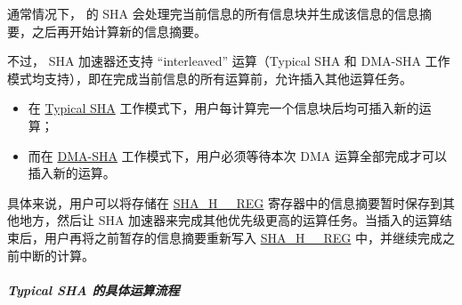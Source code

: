 \documentclass[main\_\_CN.tex]{subfiles}
\begin{document}
通常情况下，\chipname{} 的 SHA 会处理完当前信息的所有信息块并生成该信息的信息摘要，之后再开始计算新的信息摘要。

不过，\chipname{} SHA 加速器还支持 “interleaved” 运算（Typical SHA 和 DMA-SHA 工作模式均支持），即在完成当前信息的所有运算前，允许插入其他运算任务。
\begin{itemize}
    \item 在 \hyperref[sec:sha-typical-sha]{Typical SHA} 工作模式下，用户每计算完一个信息块后均可插入新的运算；
    \item 而在 \hyperref[sec:sha-dma-sha]{DMA-SHA} 工作模式下，用户必须等待本次 DMA 运算全部完成才可以插入新的运算。
\end{itemize}

具体来说，用户可以将存储在 \hyperref[regdesc:SHAHNREG]{SHA\_H\_\_REG} 寄存器中的信息摘要暂时保存到其他地方，然后让 SHA 加速器来完成其他优先级更高的运算任务。当插入的运算结束后，用户再将之前暂存的信息摘要重新写入 \hyperref[regdesc:SHAHNREG]{SHA\_H\_\_REG} 中，并继续完成之前中断的计算。

\subparagraph{Typical SHA 的具体运算流程}
\end{document}
